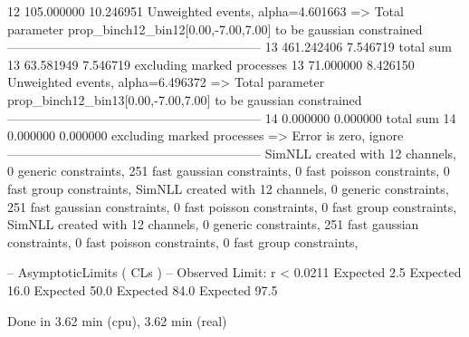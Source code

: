 12         105.000000      10.246951       Unweighted events, alpha=4.601663
  => Total parameter prop_binch12_bin12[0.00,-7.00,7.00] to be gaussian constrained
------------------------------------------------------------
13         461.242406      7.546719        total sum                     
13         63.581949       7.546719        excluding marked processes    
13         71.000000       8.426150        Unweighted events, alpha=6.496372
  => Total parameter prop_binch12_bin13[0.00,-7.00,7.00] to be gaussian constrained
------------------------------------------------------------
14         0.000000        0.000000        total sum                     
14         0.000000        0.000000        excluding marked processes    
  => Error is zero, ignore      
------------------------------------------------------------
SimNLL created with 12 channels, 0 generic constraints, 251 fast gaussian constraints, 0 fast poisson constraints, 0 fast group constraints, 
SimNLL created with 12 channels, 0 generic constraints, 251 fast gaussian constraints, 0 fast poisson constraints, 0 fast group constraints, 
SimNLL created with 12 channels, 0 generic constraints, 251 fast gaussian constraints, 0 fast poisson constraints, 0 fast group constraints, 

 -- AsymptoticLimits ( CLs ) --
Observed Limit: r < 0.0211
Expected  2.5%
Expected 16.0%
Expected 50.0%
Expected 84.0%
Expected 97.5%

Done in 3.62 min (cpu), 3.62 min (real)
